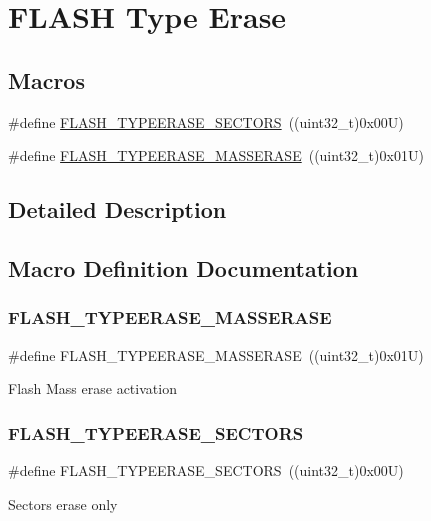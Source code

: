 \hypertarget{group___f_l_a_s_h_ex___type___erase}{}\section{F\+L\+A\+SH Type Erase}
\label{group___f_l_a_s_h_ex___type___erase}
\subsection*{Macros}
\begin{DoxyCompactItemize}
\item 
\#define \mbox{\hyperlink{group___f_l_a_s_h_ex___type___erase_gaee700cbbc746cf72fca3ebf07ee20c4e}{F\+L\+A\+S\+H\+\_\+\+T\+Y\+P\+E\+E\+R\+A\+S\+E\+\_\+\+S\+E\+C\+T\+O\+RS}}~((uint32\+\_\+t)0x00\+U)
\item 
\#define \mbox{\hyperlink{group___f_l_a_s_h_ex___type___erase_ga9bc03534e69c625e1b4f0f05c3852243}{F\+L\+A\+S\+H\+\_\+\+T\+Y\+P\+E\+E\+R\+A\+S\+E\+\_\+\+M\+A\+S\+S\+E\+R\+A\+SE}}~((uint32\+\_\+t)0x01\+U)
\end{DoxyCompactItemize}


\subsection{Detailed Description}


\subsection{Macro Definition Documentation}
\mbox{\label{group___f_l_a_s_h_ex___type___erase_ga9bc03534e69c625e1b4f0f05c3852243}} 
\subsubsection{\texorpdfstring{FLASH\_TYPEERASE\_MASSERASE}{FLASH\_TYPEERASE\_MASSERASE}}
{\footnotesize\ttfamily \#define F\+L\+A\+S\+H\+\_\+\+T\+Y\+P\+E\+E\+R\+A\+S\+E\+\_\+\+M\+A\+S\+S\+E\+R\+A\+SE~((uint32\+\_\+t)0x01\+U)}

Flash Mass erase activation \mbox{\label{group___f_l_a_s_h_ex___type___erase_gaee700cbbc746cf72fca3ebf07ee20c4e}} 
\subsubsection{\texorpdfstring{FLASH\_TYPEERASE\_SECTORS}{FLASH\_TYPEERASE\_SECTORS}}
{\footnotesize\ttfamily \#define F\+L\+A\+S\+H\+\_\+\+T\+Y\+P\+E\+E\+R\+A\+S\+E\+\_\+\+S\+E\+C\+T\+O\+RS~((uint32\+\_\+t)0x00\+U)}

Sectors erase only 